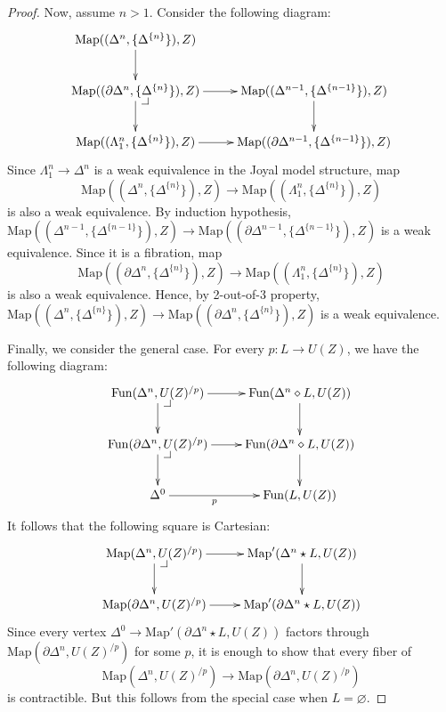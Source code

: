 \documentclass[reqno]{amsart}
\makeatletter
\theoremstyle{definition}
\theoremstyle{remark}
\newcommand{\join}{\star}
\newcommand{\fjoin}{\diamond}
\newcommand{\Map}{\mathrm{Map}}
\newcommand{\Fun}{\mathrm{Fun}}
\numberwithin{figure}{section}
\newcommand{\pb}[1][dr]{\save*!/#1-1.2pc/#1:(-1,1)@^{|-}\restore}
\makeatother
\begin{document}
\begin{proof}
Now, assume $n > 1$.
Consider the following diagram:
\[ \xymatrix{ \Map((\Delta^n, \{ \Delta^{\{n\}} \}), Z) \ar[d] \\
              \Map((\partial \Delta^n, \{ \Delta^{\{n\}} \}), Z) \ar[r] \ar[d] \pb & \Map((\Delta^{n-1}, \{ \Delta^{\{n-1\}} \}), Z) \ar[d] \\
              \Map((\Lambda^n_1, \{ \Delta^{\{n\}} \}), Z) \ar[r] & \Map((\partial \Delta^{n-1}, \{ \Delta^{\{n-1\}} \}), Z)
            } \]
Since $\Lambda^n_1 \to \Delta^n$ is a weak equivalence in the Joyal model structure, map
\[ \Map((\Delta^n, \{ \Delta^{\{n\}} \}), Z) \to \Map((\Lambda^n_1, \{ \Delta^{\{n\}} \}), Z) \]
is also a weak equivalence.
By induction hypothesis, $\Map((\Delta^{n-1}, \{ \Delta^{\{n-1\}} \}), Z) \to \Map((\partial \Delta^{n-1}, \{ \Delta^{\{n-1\}} \}), Z)$ is a weak equivalence.
Since it is a fibration, map
\[ \Map((\partial \Delta^n, \{ \Delta^{\{n\}} \}), Z) \to \Map((\Lambda^n_1, \{ \Delta^{\{n\}} \}), Z) \]
is also a weak equivalence.
Hence, by 2-out-of-3 property, $\Map((\Delta^n, \{ \Delta^{\{n\}} \}), Z) \to \Map((\partial \Delta^n, \{ \Delta^{\{n\}} \}), Z)$ is a weak equivalence.

Finally, we consider the general case.
For every $p : L \to U(Z)$, we have the following diagram:
\[ \xymatrix{ \Fun(\Delta^n, U(Z)^{/p}) \ar[r] \ar[d] \pb & \Fun(\Delta^n \fjoin L, U(Z)) \ar[d] \\
              \Fun(\partial \Delta^n, U(Z)^{/p}) \ar[r] \ar[d] \pb & \Fun(\partial \Delta^n \fjoin L, U(Z)) \ar[d] \\
              \Delta^0 \ar[r]_-p & \Fun(L,U(Z))
            } \]
It follows that the following square is Cartesian:
\[ \xymatrix{ \Map(\Delta^n, U(Z)^{/p}) \ar[r] \ar[d] \pb & \Map'(\Delta^n \join L, U(Z)) \ar[d] \\
              \Map(\partial \Delta^n, U(Z)^{/p}) \ar[r] & \Map'(\partial \Delta^n \join L, U(Z))
            } \]
Since every vertex $\Delta^0 \to \Map'(\partial \Delta^n \join L, U(Z))$ factors through $\Map(\partial \Delta^n, U(Z)^{/p})$
for some $p$, it is enough to show that every fiber of \[ \Map(\Delta^n, U(Z)^{/p}) \to \Map(\partial \Delta^n, U(Z)^{/p}) \] is contractible.
But this follows from the special case when $L = \varnothing$.
\end{proof}
\end{document}
